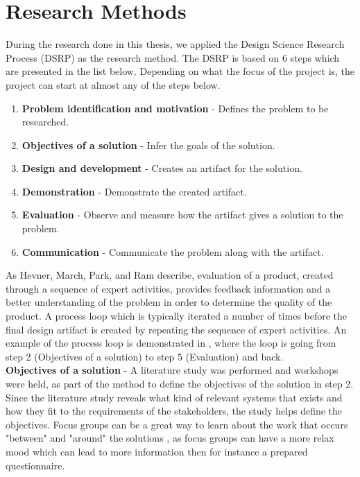 \section{Research Methods} %
\label{sec:research_method}

During the research done in this thesis, we applied the Design Science Research 
Process (DSRP) as the research method. The DSRP is based on 6 steps which are 
presented in the list below. Depending on what the focus of the project is, 
the project can start at almost any of the steps below. \cite{peffers2006design}

\begin{enumerate}
	\item \textbf{Problem identification and motivation} - Defines the problem to be
	researched. 
	\item \textbf{Objectives of a solution} - Infer the goals of the solution.
	\item \textbf{Design and development} - Creates an artifact for the solution.
	\item \textbf{Demonstration} - Demonstrate the created artifact.
	\item \textbf{Evaluation} - Observe and measure how the artifact gives a 
	solution to the problem.
	\item \textbf{Communication} - Communicate the problem along with the artifact.
\end{enumerate}

As Hevner, March, Park, and Ram \cite{von2004design} describe, 
evaluation of a product, created through a sequence of expert activities, 
provides feedback information and a better understanding of the problem in 
order to determine the quality of the product. A process loop which is typically 
iterated a number of times before the final design artifact is created 
by repeating the sequence of expert activities. An example of the process loop 
is demonstrated in , where the loop is going 
from step 2 (Objectives of a solution) to step 5 (Evaluation) and back.\\

\textbf{Objectives of a solution} - A literature study was performed and workshops were held, as part of the 
method to define the objectives of the solution in step 2. Since the literature study 
reveals what kind of relevant systems that exists and how they fit to the
requirements of the stakeholders, the study helps define the objectives. Focus
groups can be a great way to learn about the work that occurs "between" and 
"around" the solutions \cite{FocusGroupstoStudyWorkPractice}, as focus groups
can have a more relax mood which can lead to more information then for 
instance a prepared questionnaire.\\

